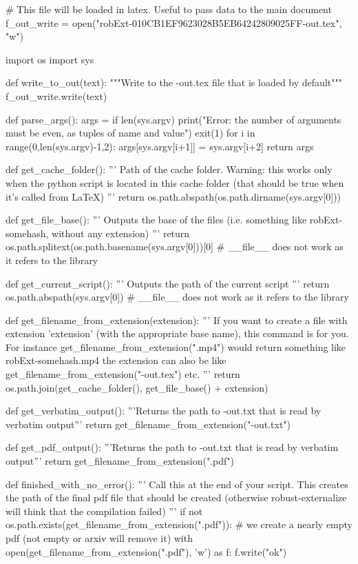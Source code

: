 
# This file will be loaded in latex. Useful to pass data to the main document
f_out_write = open("robExt-010CB1EF9623028B5EB64242809025FF-out.tex", "w")

import os
import sys

def write_to_out(text):
    """Write to the -out.tex file that is loaded by default"""
    f_out_write.write(text)

def parse_args():
    args = {}
    if len(sys.argv) %
        print("Error: the number of arguments must be even, as tuples of name and value")
        exit(1)
    for i in range(0,len(sys.argv)-1,2):
        args[sys.argv[i+1]] = sys.argv[i+2]
    return args

def get_cache_folder():
    '''
    Path of the cache folder. Warning: this works only when the python script
    is located in this cache folder (that should be true when it's called from LaTeX)
    '''
    return os.path.abspath(os.path.dirname(sys.argv[0]))

def get_file_base():
    '''
    Outputs the base of the files (i.e. something like robExt-somehash, without any extension)
    '''
    return os.path.splitext(os.path.basename(sys.argv[0]))[0] # __file__ does not work as it refers to the library

def get_current_script():
    '''
    Outputs the path of the current script
    '''
    return os.path.abspath(sys.argv[0]) # __file__ does not work as it refers to the library


def get_filename_from_extension(extension):
    '''
    If you want to create a file with extension 'extension' (with the appropriate base name), this command
    is for you. For instance get_filename_from_extension(".mp4") would return something like
    robExt-somehash.mp4
    the extension can also be like get_filename_from_extension("-out.tex") etc.
    '''
    return os.path.join(get_cache_folder(), get_file_base() + extension)

def get_verbatim_output():
    '''Returns the path to -out.txt that is read by verbatim output'''
    return get_filename_from_extension("-out.txt")

def get_pdf_output():
    '''Returns the path to -out.txt that is read by verbatim output'''
    return get_filename_from_extension(".pdf")


def finished_with_no_error():
    '''
    Call this at the end of your script. This creates the path of the final pdf file that should be
    created (otherwise robust-externalize will think that the compilation failed)
    '''
    if not os.path.exists(get_filename_from_extension(".pdf")):
        # we create a nearly empty pdf (not empty or arxiv will remove it)
        with open(get_filename_from_extension(".pdf"), 'w') as f:
            f.write("ok")

